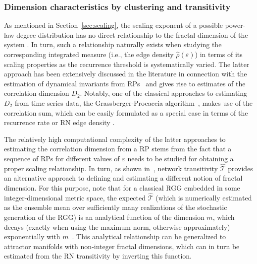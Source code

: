        		 \subsubsection{Dimension characteristics by clustering and transitivity} \label{sec:transitivity}
		As mentioned in Section~\ref{sec:scaling}, the scaling exponent of a possible power-law degree distribution has no direct relationship to the fractal dimension of the system \cite{Zou2012}. In turn, such a relationship naturally exists when studying the corresponding integrated measure (i.e., the edge density $\hat{\rho}(\varepsilon)$) in terms of its scaling properties as the recurrence threshold is systematically varied. The latter approach has been extensively discussed in the literature in connection with the estimation of dynamical invariants from RPs~\cite{Faure1998,thiel2004a} and gives rise to estimates of the correlation dimension $D_2$. Notably, one of the classical approaches to estimating $D_2$ from time series data, the Grassberger-Procaccia algorithm~\cite{Grassberger1983PLA,Grassberger1983PRL}, makes use of the correlation sum, which can be easily formulated as a special case in terms of the recurrence rate or RN edge density \cite{Faure1998}.

		The relatively high computational complexity of the latter approaches to estimating the correlation dimension from a RP stems from the fact that a sequence of RPs for different values of $\varepsilon$ needs to be studied for obtaining a proper scaling relationship. In turn, as shown in~\cite{Donner2011b}, network transitivity $\hat{\mathcal{T}}$ provides an alternative approach to defining and estimating a different notion of fractal dimension. For this purpose, note that for a classical RGG embedded in some integer-dimensional metric space, the expected $\hat{\mathcal{T}}$ (which is numerically estimated as the ensemble mean over sufficiently many realizations of the stochastic generation of the RGG) is an analytical function of the dimension $m$, which decays (exactly when using the maximum norm, otherwise approximately) exponentially with $m$~\cite{Dall2002}. This analytical relationship can be generalized to attractor manifolds with non-integer fractal dimensions, which can in turn be estimated from the RN transitivity by inverting this function.

